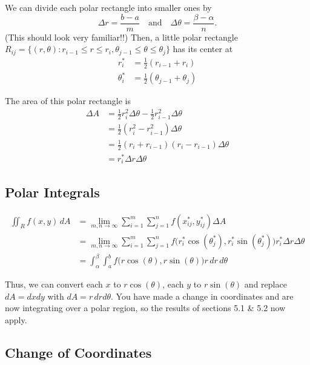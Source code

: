 We can divide each polar rectangle into smaller ones by
\[
  \Delta r = \frac{b-a}{m} \quad \text{and} \quad \Delta \theta = \frac{\beta-\alpha}{n}.
\]
(This should look very familiar!!) Then, a little polar rectangle \(R_{ij} = \{(r, \theta) : r_{i-1} \leq r \leq r_i, \theta_{j-1} \leq \theta \leq \theta_j\}\) has its center at
\begin{align*}
  r^*_i & = \tfrac{1}{2}(r_{i-1} + r_i) \\
  \theta^*_i & = \tfrac{1}{2}(\theta_{j-1} + \theta_j)
\end{align*}

The area of this polar rectangle is
\begin{align*}
  \Delta A & = \tfrac{1}{2}r_i^2 \Delta \theta - \frac{1}{2}r_{i-1}^2 \Delta \theta \\
           & = \tfrac{1}{2}\left(r_i^2 - r_{i-1}^2\right) \Delta \theta \\
           & = \tfrac{1}{2}(r_i + r_{i-1})(r_i - r_{i-1}) \Delta \theta \\
           & = r^*_i \Delta r \Delta \theta
\end{align*}

\subsection{Polar Integrals}

\begin{align*}
  \iint_{R}f(x,y) \, dA & = \lim_{m,n \to \infty} \sum_{i=1}^{m} \sum_{j=1}^{n} f(x^*_{ij}, y^*_{ij}) \Delta A \\
                        & = \lim_{m,n \to \infty} \sum_{i=1}^{m} \sum_{j=1}^{n} f\bigl(r^*_i \cos\left(\theta^*_j\right), r^*_i \sin\left(\theta^*_j\right)\bigr) r^*_i \Delta r \Delta \theta \\
                        & = \int_{\alpha}^{\beta} \int_{a}^{b} f\bigl(r \cos(\theta), r \sin(\theta) \bigr) r \, dr \, d\theta
\end{align*}

Thus, we can convert each \(x\) to \(r \cos(\theta)\), each \(y\) to \(r \sin(\theta)\) and replace \(dA = dxdy\) with \(dA = r \, dr d\theta\). You have made a change in coordinates and are now integrating over a polar region, so the results of sections 5.1 \& 5.2 now apply.

\subsection{Change of Coordinates}

